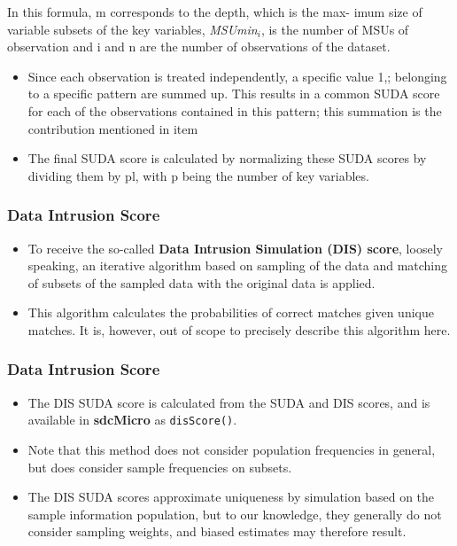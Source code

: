 \documentclass{beamer}
\begin{document}
	\begin{frame}
		
		In this formula, m corresponds to the depth, which is the max-
		imum size of variable subsets of the key variables, \textit{MSUmin}$_i$, is the number of
		MSUs of observation and i and n are the number of observations of the dataset.
		\begin{itemize}
			\item Since each observation is treated independently, a speciﬁc value 1,; belonging to a
			speciﬁc pattern are summed up. This results in a common SUDA score for each
			of the observations contained in this pattern; this summation is the contribution
			mentioned in item 
			\item The final SUDA score is calculated by normalizing these SUDA scores by dividing them by pl, with p being the number of key variables.
		\end{itemize}
	\end{frame}
	\begin{frame}
		\frametitle{Data Intrusion Score}
		\begin{itemize} 
			\item To receive the so-called
			\textbf{Data Intrusion Simulation (DIS) score}, loosely speaking, an iterative algorithm
			based on sampling of the data and matching of subsets of the sampled data with
			the original data is applied. 
			\item This algorithm calculates the probabilities of correct
			matches given unique matches. It is, however, out of scope to precisely describe
			this algorithm here. %
		\end{itemize}
				\end{frame}
				\begin{frame}
					\frametitle{Data Intrusion Score}
					\begin{itemize} 
			\item The DIS SUDA score is calculated from the SUDA and DIS scores, and is available in \textbf{sdcMicro} as \texttt{disScore()}.
			\item Note that this method does not consider population frequencies in general, but
			does consider sample frequencies on subsets. 
			\item The DIS SUDA scores approximate
			uniqueness by simulation based on the sample information population, but to our
			knowledge, they generally do not consider sampling weights, and biased estimates
			may therefore result.
		\end{itemize}
	\end{frame}
\end{document}
